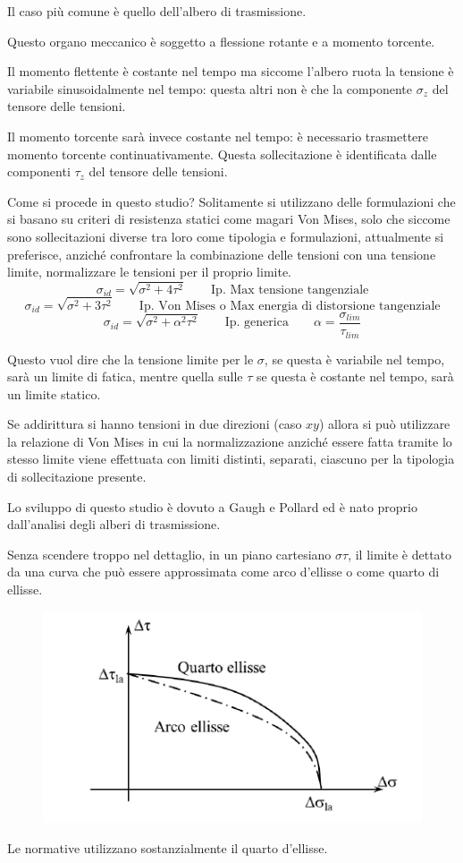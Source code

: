 			Il caso più comune è quello dell'albero di trasmissione. 
			
			Questo organo meccanico è soggetto a flessione rotante e a momento torcente. 
			
			Il momento flettente è costante nel tempo ma siccome l'albero ruota la tensione è variabile sinusoidalmente nel tempo: questa altri non è che la componente $\sigma_z$ del tensore delle tensioni.
			
			Il momento torcente sarà invece costante nel tempo: è necessario trasmettere momento torcente continuativamente. Questa sollecitazione è identificata dalle componenti $\tau_z$ del tensore delle tensioni. \newline
			
			Come si procede in questo studio? Solitamente si utilizzano delle formulazioni che si basano su criteri di resistenza statici come magari Von Mises, solo che siccome sono sollecitazioni diverse tra loro come tipologia e formulazioni, attualmente si preferisce, anziché confrontare la combinazione delle tensioni con una tensione limite, normalizzare le tensioni per il proprio limite.
			\[\sigma_{id} = \sqrt{\sigma^2 + 4\tau^2} \qquad \text{Ip. Max tensione tangenziale}\]
			\[\sigma_{id} = \sqrt{\sigma^2 + 3\tau^2} \qquad \text{Ip. Von Mises o Max energia di distorsione tangenziale}\]
			\[\sigma_{id} = \sqrt{\sigma^2 + \alpha^2\tau^2} \qquad \text{Ip. generica} \qquad \alpha = \dfrac{\sigma_{lim}}{\tau_{lim}}\]

			Questo vuol dire che la tensione limite per le $\sigma$, se questa è variabile nel tempo, sarà un limite di fatica, mentre quella sulle $\tau$ se questa è costante nel tempo, sarà un limite statico.
			
			Se addirittura si hanno tensioni in due direzioni (caso $xy$) allora si può utilizzare la relazione di Von Mises in cui la normalizzazione anziché essere fatta tramite lo stesso limite viene effettuata con limiti distinti, separati, ciascuno per la tipologia di sollecitazione presente. 
			
			Lo sviluppo di questo studio è dovuto a Gaugh e Pollard ed è nato proprio dall'analisi degli alberi di trasmissione.
			
			Senza scendere troppo nel dettaglio, in un piano cartesiano $\sigma\tau$, il limite è dettato da una curva che può essere approssimata come arco d'ellisse o come quarto di ellisse. 
\begin{figure}[H]
	\centering
	\label{fig:screenshot013}
	\includegraphics[width=0.5\linewidth]{immagini_11/screenshot013}
\end{figure}			
			Le normative utilizzano sostanzialmente il quarto d'ellisse. 
			

